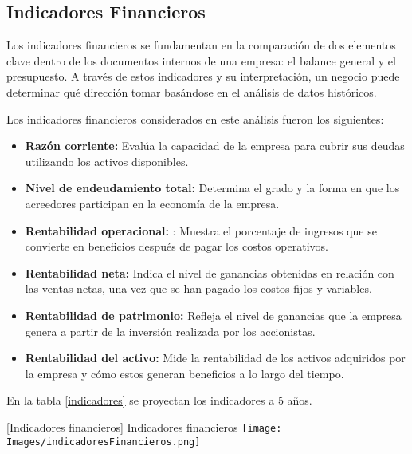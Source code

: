 \subsection{Indicadores Financieros}

Los indicadores financieros se fundamentan en la comparación de dos elementos clave dentro de los documentos internos de una empresa: el balance general y el presupuesto. A través de estos indicadores y su interpretación, un negocio puede determinar qué dirección tomar basándose en el análisis de datos históricos.

Los indicadores financieros considerados en este análisis fueron los siguientes:


\begin{itemize}
    \item \textbf{Razón corriente: } Evalúa la capacidad de la empresa para cubrir sus deudas utilizando los activos disponibles.
    
    \item \textbf{Nivel de endeudamiento total: } Determina el grado y la forma en que los acreedores participan en la economía de la empresa.
    
    \item \textbf{Rentabilidad operacional: } : Muestra el porcentaje de ingresos que se convierte en beneficios después de pagar los costos operativos.
    
    \item \textbf{Rentabilidad neta: } Indica el nivel de ganancias obtenidas en relación con las ventas netas, una vez que se han pagado los costos fijos y variables.
    
    \item \textbf{Rentabilidad de patrimonio: } Refleja el nivel de ganancias que la empresa genera a partir de la inversión realizada por los accionistas.
    
    \item \textbf{Rentabilidad del activo:} Mide la rentabilidad de los activos adquiridos por la empresa y cómo estos generan beneficios a lo largo del tiempo.
\end{itemize}

En la tabla \ref{indicadores} se proyectan los indicadores a 5 años.

\vspace{2mm}
\begin{minipage}{0.9\textwidth}
\centering
{}[{Indicadores financieros}]{ Indicadores financieros}
\label{indicadores}
\texttt{[image: Images/indicadoresFinancieros.png]}
\end{minipage}


